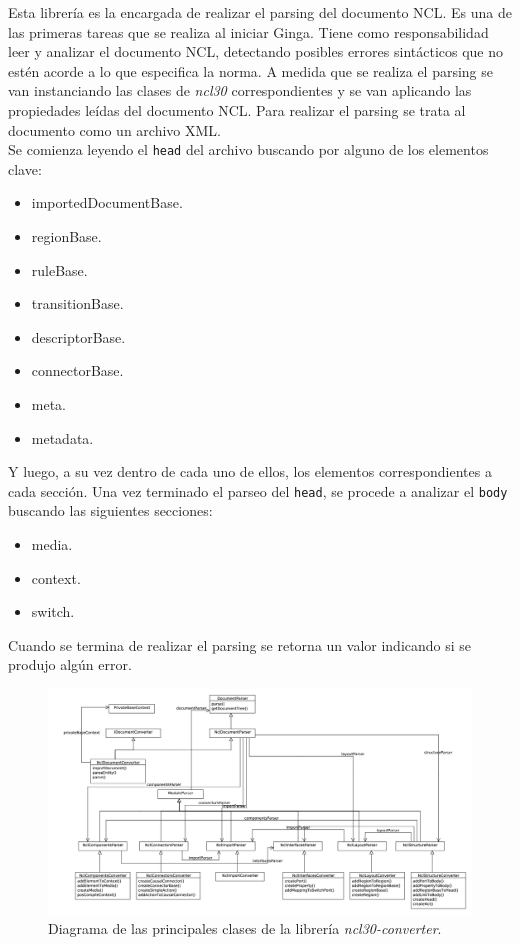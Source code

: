 Esta librería es la encargada de realizar el parsing del documento NCL. Es una de las primeras tareas que se realiza al iniciar Ginga.
Tiene como responsabilidad leer y analizar el documento NCL, detectando posibles errores sintácticos que no estén acorde a lo que especifica la norma.
A medida que se realiza el parsing se van instanciando las clases de \emph{ncl30} correspondientes y se van aplicando las propiedades leídas del documento NCL.
Para realizar el parsing se trata al documento como un archivo XML.\\
Se comienza leyendo el \texttt{head} del archivo buscando por alguno de los elementos clave:
\begin{itemize}[noitemsep,nolistsep]
\item importedDocumentBase.
\item regionBase.
\item ruleBase.
\item transitionBase.
\item descriptorBase.
\item connectorBase.
\item meta.
\item metadata.
\end{itemize}

Y luego, a su vez dentro de cada uno de ellos, los elementos correspondientes a cada sección.
Una vez terminado el parseo del \texttt{head}, se procede a analizar el \texttt{body} buscando las siguientes secciones:
\begin{itemize}[noitemsep,nolistsep]
\item media.
\item context.
\item switch.
\end{itemize}

Cuando se termina de realizar el parsing se retorna un valor indicando si se produjo algún error.

\begin{figure}[h!]
	\centering
	\includegraphics[scale=0.3]{resources/uml-ncl30-converter.jpg}
	\caption{Diagrama de las principales clases de la librería \emph{ncl30-converter}.}
\end{figure}

\FloatBarrier
